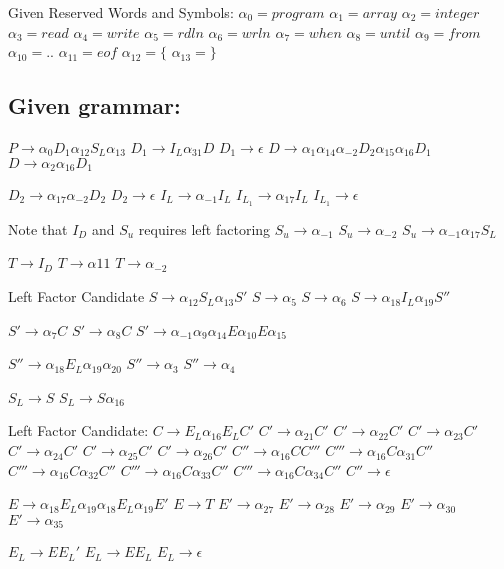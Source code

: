 \documentclass[11pt]{article}
\begin{document}
Given Reserved Words and Symbols:
$\alpha_0 = program$
$\alpha_1 = array$
$\alpha_2 = integer$
$\alpha_3 = read$
$\alpha_4 = write $
$\alpha_5 = rdln $
$\alpha_6 = wrln $
$\alpha_7 = when$
$\alpha_8 = until$ 
$\alpha_9 = from$
$\alpha_{10} = ..$
$\alpha_{11} =  eof$
$\alpha_{12} = \{ $
$\alpha_{13} = \} $



 
\subsection {Given grammar:}
$P\to \alpha_0 D_1 \alpha_{12} S_L \alpha_{13}$
$D_1 \to I_L \alpha_{31} D $
$D_1 \to \epsilon $
$D \to \alpha _1 \alpha_{14} \alpha_{-2} D_2 \alpha_{15} \alpha_{16} D_1 $
$D \to \alpha_2 \alpha_{16} D_1$

$D_2 \to \alpha_{17} \alpha_{-2} D_2$
$D_2 \to \epsilon $
$I_L \to \alpha _{-1} I_L $
$I_{L_1} \to \alpha _{17} I_L  $
$I_{L_1} \to \epsilon $

Note that $I_D$ and $S_u$ requires left factoring 
$S_u \to \alpha_{-1} $
$S_u \to \alpha_{-2} $
$S_u \to \alpha_{-1} \alpha_{17} S_L$

$T\to I_D $
$T\to \alpha{11} $
$T\to \alpha_{-2} $


Left Factor Candidate
$S \to \alpha_{12} S_L \alpha_{13} S' $
$S \to \alpha_5 $
$S \to \alpha_6 $
$S \to \alpha_{18} I_L \alpha_{19} S''$

$S' \to \alpha_7 C$
$S' \to \alpha_8 C$
$S' \to \alpha_{-1} \alpha_{9} \alpha_{14} E \alpha_{10} E \alpha_{15}$

$S'' \to \alpha_{18} E_L \alpha_{19} \alpha_{20} $
$S'' \to \alpha_{3}$
$S'' \to \alpha_{4} $


$S_L \to S $
$S_L \to S \alpha_{16}$ 

Left Factor Candidate:
$C \to E_L \alpha _{16} E_L C'$
$C' \to \alpha _{21} C'$
$C' \to \alpha _{22} C'$
$C' \to \alpha _{23} C'$
$C' \to \alpha _{24} C'$
$C' \to  \alpha _{25} C'$
$C' \to \alpha _{26} C'$
$C'' \to \alpha_{16} C C'''$
$C''' \to  \alpha_{16} C \alpha_{31} C''$
$C''' \to  \alpha_{16} C \alpha_{32} C''$
$C''' \to  \alpha_{16} C \alpha_{33} C''$
$C''' \to  \alpha_{16} C \alpha_{34} C''$
$C'' \to \epsilon $

$E \to \alpha_{18} E_L \alpha_{19}  \alpha_{18} E_L \alpha_{19}  E'$
$E\to T$
$E'\to  \alpha_{27}$
$E'\to  \alpha_{28}$
$E'\to \alpha_{29}$
$E'\to  \alpha_{30}$
$E'\to  \alpha_{35}$

$E_L \to E E_L '$
$E_L \to E E_L $
$E_L \to \epsilon $
\end{document}
